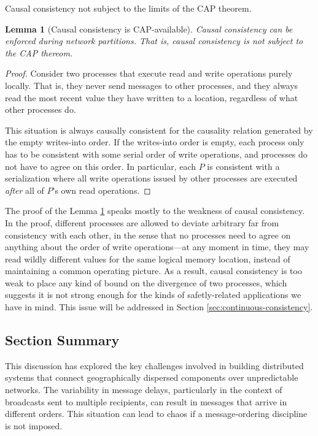 \documentclass[]             %
{NASA}                       %
\newtheorem{lemma}[theorem]{Lemma}
\theoremstyle{definition}
\begin{document}
Causal consistency not subject to the limits of the CAP theorem.

\begin{lemma}[Causal consistency is CAP-available]
  \label{thm:cap-causal}
  Causal consistency can be enforced during network partitions. That
  is, causal consistency is not subject to the CAP thereom.
\end{lemma}
\begin{proof}
  Consider two processes that execute read and write operations purely
  locally. That is, they never send messages to other processes, and
  they always read the most recent value they have written to a
  location, regardless of what other processes do.

  This situation is always causally consistent for the causality
  relation generated by the empty writes-into order. If the
  writes-into order is empty, each process only has to be consistent
  with some serial order of write operations, and processes do not
  have to agree on this order. In particular, each $P$ is
  consistent with a serialization where all write operations issued by
  other processes are executed \emph{after} all of $P$'s own read
  operations.
\end{proof}

The proof of the Lemma \ref{thm:cap-causal} speaks mostly to the
weakness of causal consistency. In the proof, different processes are
allowed to deviate arbitrary far from consistency with each other, in
the sense that no processes need to agree on anything about the order
of write operations---at any moment in time, they may read wildly
different values for the same logical memory location, instead of
maintaining a common operating picture. As a result, causal
consistency is too weak to place any kind of bound on the divergence
of two processes, which suggests it is not strong enough for the kinds
of safetly-related applications we have in mind. This issue will be
addressed in Section \ref{sec:continuous-consistency}.

\subsection{Section Summary}
\label{ssec:background-summary}
This discussion has explored the key challenges involved in building
distributed systems that connect geographically dispersed components
over unpredictable networks. The variability in message delays,
particularly in the context of broadcasts sent to multiple recipients,
can result in messages that arrive in different orders.  This
situation can lead to chaos if a message-ordering discipline is not
imposed.
\end{document}
